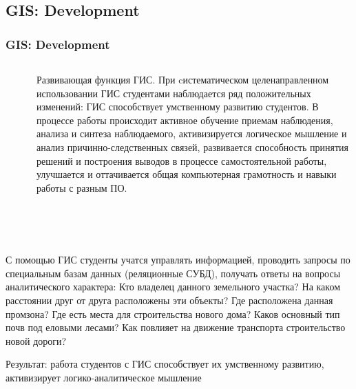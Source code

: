 \documentclass[pdflatex,compress,8pt,
	xcolor={dvipsnames,dvipsnames,svgnames,x11names,table},
	hyperref={	 
	pdfauthor={Lemenkova Polina}, 
	pdfsubject={Preentation}, 
	pdfcreator={Lemenkova Polina}, 
	pdfproducer={Lemenkova Polina}, 
	colorlinks=true,
	linkcolor=Red3, 
	citecolor=NavyBlue, 
	urlcolor = NavyBlue, 
	breaklinks = true}]{beamer}
\begin{document}
\subsection{GIS: Development}
\begin{frame}\frametitle{GIS: Development}

	\begin{minipage}[0.4\textheight]{\textwidth}
		\begin{columns}[T]
			\begin{column}{0.4\textwidth}
				\begin{figure}[H]
					\centering
					\texttt{[image: F7.jpg]}
				\end{figure}
			\end{column}
			\begin{column}{0.6\textwidth}
\begin{block}{}
Развивающая функция ГИС. При cистематическом целенаправленном использовании ГИС студентами наблюдается ряд положительных изменений: ГИС способствует умственному развитию студентов. В процессе работы происходит активное обучение приемам наблюдения,  анализа и синтеза наблюдаемого, активизируется логическое мышление и анализ причинно-следственных связей, развивается способность принятия решений и построения выводов в процессе самостоятельной работы, улучшается и оттачивается общая компьютерная грамотность и навыки работы с разным ПО.
\end{block}
			\end{column}
		\end{columns}
	\end{minipage}

\begin{block}{}
\small{С помощью ГИС студенты учатся управлять информацией, 
проводить запросы по специальным базам данных (реляционные СУБД), 
получать ответы на вопросы аналитического характера: Кто владелец данного земельного участка? 
На каком расстоянии друг от друга расположены эти объекты?
Где расположена данная промзона?
Где есть места для строительства нового дома? 
Каков основный тип почв под еловыми лесами? 
Как повлияет на движение транспорта строительство новой дороги?}
\end{block}

\begin{block}{}
Результат: работа студентов с ГИС способствует их умственному развитию, активизирует логико-аналитическое мышление
\end{block}

\end{frame}
\end{document}
